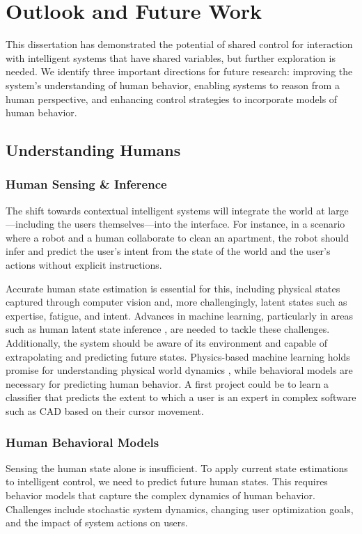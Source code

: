 \chapter{Outlook and Future Work}
\label{ch:outlook}
This dissertation has demonstrated the potential of shared control for interaction with intelligent systems that have shared variables, but further exploration is needed. We identify three important directions for future research: improving the system's understanding of human behavior, enabling systems to reason from a human perspective, and enhancing control strategies to incorporate models of human behavior.

\section{Understanding Humans}
\subsection{Human Sensing \& Inference}
The shift towards contextual intelligent systems will integrate the world at large—including the users themselves—into the interface. For instance, in a scenario where a robot and a human collaborate to clean an apartment, the robot should infer and predict the user's intent from the state of the world and the user's actions without explicit instructions.

Accurate human state estimation is essential for this, including physical states captured through computer vision and, more challengingly, latent states such as expertise, fatigue, and intent. Advances in machine learning, particularly in areas such as human latent state inference \cite{li2017inferring}, are needed to tackle these challenges. Additionally, the system should be aware of its environment and capable of extrapolating and predicting future states. Physics-based machine learning holds promise for understanding physical world dynamics \cite{christen2023learning}, while behavioral models are necessary for predicting human behavior. A first project could be to learn a classifier that predicts the extent to which a user is an expert in complex software such as CAD based on their cursor movement.

\subsection{Human Behavioral Models}
Sensing the human state alone is insufficient. To apply current state estimations to intelligent control, we need to predict future human states. This requires behavior models that capture the complex dynamics of human behavior. Challenges include stochastic system dynamics, changing user optimization goals, and the impact of system actions on users.

